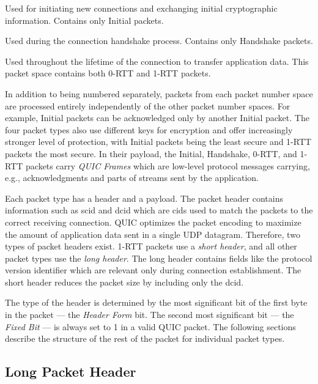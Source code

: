 \begin{enumerate}

   Used for initiating new connections and exchanging initial cryptographic
information. Contains only Initial packets.

   Used during the connection handshake process. Contains only Handshake packets.

   Used throughout the lifetime of the connection to transfer application data.
This packet space contains both 0-RTT and 1-RTT packets.

\end{enumerate}

In addition to being numbered separately, packets from each packet number space are processed
entirely independently of the other packet number spaces. For example, Initial packets can be
acknowledged only by another Initial packet. The four packet types also use different keys for
encryption and offer increasingly stronger level of protection, with Initial packets being the least
secure and 1-RTT packets the most secure. In their payload, the Initial, Handshake, 0-RTT, and 1-RTT
packets carry \textit{QUIC Frames} which are low-level protocol messages carrying, e.g.,
acknowledgments and parts of streams sent by the application.

Each packet type has a header and a payload. The packet header contains information such as
\gls{scid} and \gls{dcid} which are \glspl{cid} used to match the packets to the correct receiving
connection. QUIC optimizes the packet encoding to maximize the amount of application data sent in a
single UDP datagram. Therefore, two types of packet headers exist. 1-RTT packets use a \textit{short
  header}, and all other packet types use the \textit{long header}. The long header contains fields
like the protocol version identifier which are relevant only during connection establishment. The
short header reduces the packet size by including only the \gls{dcid}\@.

The type of the header is determined by the most significant bit of the first byte in the packet ---
the \textit{Header Form} bit. The second most significant bit --- the \textit{Fixed Bit} --- is
always set to 1 in a valid QUIC packet. The following sections describe the structure of the rest of
the packet for individual packet types.

\newcommand{\longFieldHeight}{1}

\subsection{Long Packet Header}

